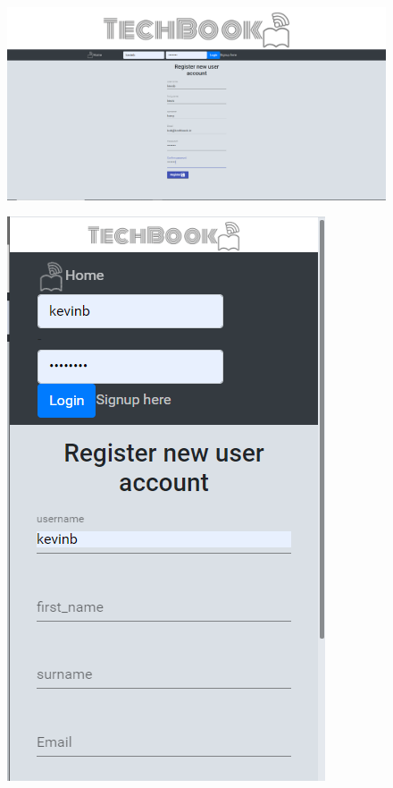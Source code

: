 \begin{figure}[H]
\centering
\begin{minipage}{.75\textwidth}
  \centering
  \includegraphics[width=.9\linewidth]{img/ui/sigup_PC.PNG}
  \label{fig:signupPC}
\end{minipage}%
\begin{minipage}{.25\textwidth}
  \centering
  \includegraphics[width=.9\linewidth]{img/ui/signup_MOBILE.PNG}
  \label{fig:signupMOBILE}
\end{minipage}
\end{figure}

